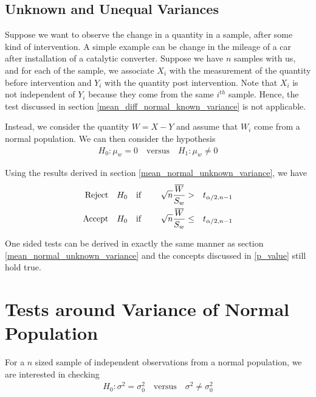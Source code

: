 \documentclass[../probability-notes.tex]{subfiles}
\begin{document}
    \subsection{Unknown and Unequal Variances}
    Suppose we want to observe the change in a quantity in a sample, after some kind of intervention. A simple example can be change in the mileage of a car after installation of a catalytic converter. Suppose we have $n$ samples with us, and for each of the sample, we associate $X_{i}$ with the measurement of the quantity before intervention and $Y_{i}$ with the quantity post intervention. Note that $X_{i}$ is not independent of $Y_{i}$ because they come from the same $i^{th}$ sample. Hence, the test discussed in section \ref{mean_diff_normal_known_variance} is not applicable.\newline

    Instead, we consider the quantity $W = X - Y$ and assume that $W_{i}$ come from a normal population. We can then consider the hypothesis
    \begin{align*}
        H_{0}: \mu_{w} = 0 \quad \text{versus} \quad H_{1}: \mu_{w} \neq 0
    \end{align*}

    Using the results derived in section \ref{mean_normal_unknown_variance}, we have
    \begin{alignat*}{4}
        \text{Reject\quad} &H_{0} \text{\quad if \quad} &\sqrt{n}\frac{\overline{W}}{S_{w}} &> &t_{\alpha/2, n-1}\\
        \text{Accept\quad} &H_{0} \text{\quad if\quad} &\sqrt{n}\frac{\overline{W}}{S_{w}} &\leq &t_{\alpha/2, n-1}
    \end{alignat*}

    One sided tests can be derived in exactly the same manner as section \ref{mean_normal_unknown_variance} and the concepts discussed in \ref{p_value} still hold true.


    \section{Tests around Variance of Normal Population}
    For a $n$ sized sample of independent observations from a normal population, we are interested in checking
    \begin{align*}
        H_{0}: \sigma^{2} = \sigma_{0}^{2} \quad \text{versus} \quad \sigma^{2} \neq \sigma_{0}^{2}
    \end{align*}
\end{document}
